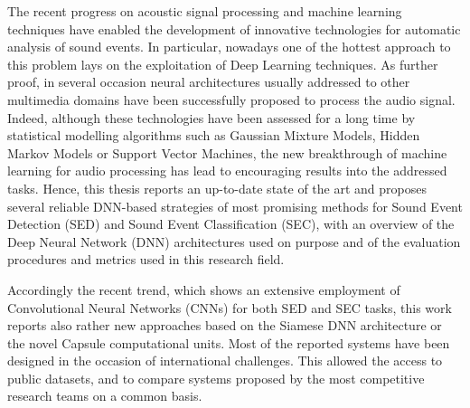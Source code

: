\documentclass[a4print,english,lof,lot]{univpmphdthesis}
\begin{document}
\frontmatter

\maketitle

\begin{thesisacknowledge}

\end{thesisacknowledge}

%

\begin{thesisabstract}
The recent progress on acoustic signal processing and machine learning techniques have enabled the
development of innovative technologies for automatic analysis of sound events. In particular, nowadays one of the hottest approach to this problem lays on the exploitation of Deep Learning techniques. As further proof, in several occasion neural architectures usually addressed to other multimedia domains have been successfully proposed to process the audio signal. 
Indeed, although these technologies have been assessed for a long time by statistical modelling algorithms such as Gaussian Mixture Models, Hidden Markov Models or Support Vector Machines, the new breakthrough of machine learning for audio processing has lead to encouraging results into the addressed tasks. 
Hence, this thesis reports an up-to-date state of the art and proposes several reliable DNN-based strategies of most promising methods for Sound Event Detection (SED) and Sound Event Classification (SEC), with an overview of the Deep Neural Network (DNN) architectures used on purpose and of the evaluation procedures and metrics used in this research field.

Accordingly the recent trend, which shows an extensive employment of Convolutional Neural Networks (CNNs) for both SED and SEC tasks, this work reports also rather new approaches based on the Siamese DNN architecture or the novel Capsule computational units.
Most of the reported systems have been designed in the occasion of international challenges. This allowed the access to public datasets, and to compare systems proposed by the most competitive research teams on a common basis.


\end{thesisabstract}
\end{document}
